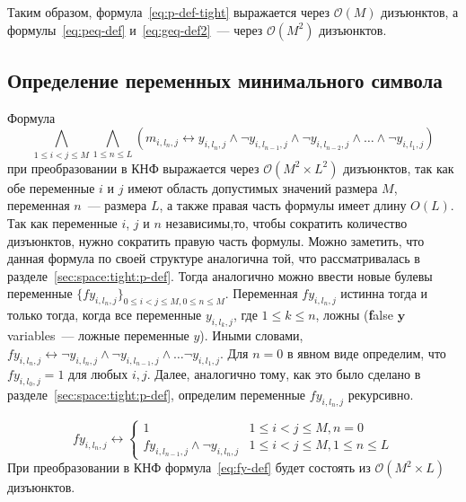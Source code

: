 Таким образом, формула~\eqref{eq:p-def-tight} выражается через $\mathcal{O}\left(M\right)$ дизъюнктов, а формулы~\eqref{eq:peq-def} и~\eqref{eq:geq-def2}~{---} через $\mathcal{O}\left(M^{2}\right)$ дизъюнктов.


\subsection{Определение переменных минимального символа}
\label{sec:space:tight:m-def}

Формула
\begin{equation*}
\bigwedge_{1 \leq i < j \leq M} \bigwedge_{1 \leq n \leq L} \left(m_{i,l_{n},j} \leftrightarrow y_{i,l_{n},j} \wedge \neg y_{i,l_{n - 1}, j} \wedge \neg y_{i,l_{n - 2}, j} \wedge \ldots \wedge \neg y_{i,l_{1},j} \right)
\end{equation*}
при преобразовании в КНФ выражается через $\mathcal{O}\left(M^{2} \times L^{2}\right)$ дизъюнктов, так как обе переменные $i$ и $j$ имеют область допустимых значений размера $M$, переменная $n$~{---} размера $L$, а также правая часть формулы имеет длину $O\left(L\right)$.
Так как переменные $i$, $j$ и $n$ независимы,то, чтобы сократить количество дизъюнктов, нужно сократить правую часть формулы.
Можно заметить, что данная формула по своей структуре аналогична той, что рассматривалась в разделе~\ref{sec:space:tight:p-def}.
Тогда аналогично можно ввести новые булевы переменные $\{\mathit{fy}_{i,l_{n},j}\}_{0 \leq i < j \leq M,0 \leq n \leq M}$.
Переменная $\mathit{fy}_{i,l_{n},j}$ истинна тогда и только тогда, когда все переменные $y_{i,l_{k},j}$, где $1 \leq k \leq n$, ложны (\textbf{f}alse $\boldsymbol{y}$ variables~{---} ложные переменные $y$).
Иными словами, $\mathit{fy}_{i,l_{n},j} \leftrightarrow \neg y_{i,l_{n},j} \wedge \neg y_{i, l_{n - 1}, j} \wedge \ldots \neg y_{i,l_{1},j}$. 
Для $n = 0$ в явном виде определим, что $\mathit{fy}_{i,l_{0},j} = 1$ для любых $i,j$.
Далее, аналогично тому, как это было сделано в разделе~\ref{sec:space:tight:p-def}, определим переменные $\mathit{fy}_{i,l_{n},j}$ рекурсивно.

\begin{equation}
\label{eq:fy-def}
  \mathit{fy}_{i,l_{n},j} \leftrightarrow 
    \begin{cases} 
      1                               & 1 \leq i < j \leq M, n = 0 \\
      \mathit{fy}_{i,l_{n - 1},j} \wedge \neg y_{i,l_{n},j}  & 1 \leq i < j \leq M, 1 \leq n \leq L
    \end{cases} 
\end{equation}
%
При преобразовании в КНФ формула~\eqref{eq:fy-def} будет состоять из $\mathcal{O}\left(M^{2} \times L\right)$ дизъюнктов.

